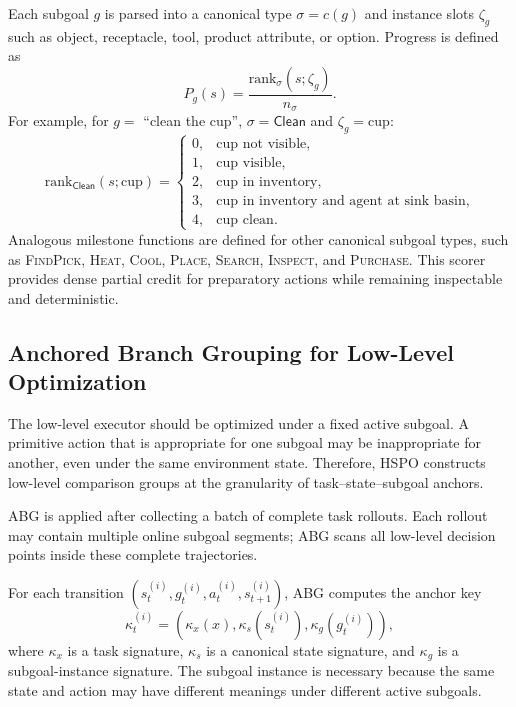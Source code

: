 \documentclass{article}
\newcommand{\wei}[1]{\textcolor{red}{#1}}
\begin{document}
Each subgoal $g$ is parsed into a canonical type $\sigma=c(g)$ and instance slots $\zeta_g$ such as object, receptacle, tool, product attribute, or option. Progress is defined as
\begin{equation}
P_g(s)
=
\frac{\mathrm{rank}_{\sigma}(s;\zeta_g)}{n_{\sigma}}.
\label{eq:progress}
\end{equation}
For example, for $g=$ ``clean the cup'', $\sigma=\mathsf{Clean}$ and $\zeta_g=\mathrm{cup}$:
\begin{equation}
\mathrm{rank}_{\mathsf{Clean}}(s;\mathrm{cup})
=
\begin{cases}
0, & \text{cup not visible},\\
1, & \text{cup visible},\\
2, & \text{cup in inventory},\\
3, & \text{cup in inventory and agent at sink basin},\\
4, & \text{cup clean}.
\end{cases}
\label{eq:clean_rank}
\end{equation}
Analogous milestone functions are defined for other canonical subgoal types, such as \textsc{FindPick}, \textsc{Heat}, \textsc{Cool}, \textsc{Place}, \textsc{Search}, \textsc{Inspect}, and \textsc{Purchase}. This scorer provides dense partial credit for preparatory actions while remaining inspectable and deterministic.

\subsection{Anchored Branch Grouping for Low-Level Optimization} %

The low-level executor should be optimized under a fixed active subgoal. A primitive action that is appropriate for one subgoal may be inappropriate for another, even under the same environment state. Therefore, HSPO constructs low-level comparison groups at the granularity of task--state--subgoal anchors.

ABG is applied after collecting a batch of complete task rollouts. Each rollout may contain multiple online subgoal segments; ABG scans all low-level decision points inside these complete trajectories.

For each transition $(s_t^{(i)},g_t^{(i)},a_t^{(i)},s_{t+1}^{(i)})$, ABG computes the anchor key
\begin{equation}
\kappa_t^{(i)}
=
(\kappa_x(x),\kappa_s(s_t^{(i)}),\kappa_g(g_t^{(i)})),
\label{eq:anchor}
\end{equation}
where $\kappa_x$ is a task signature, $\kappa_s$ is a canonical state signature, and $\kappa_g$ is a subgoal-instance signature. The subgoal instance is necessary because the same state and action may have different meanings under different active subgoals.
\end{document}
